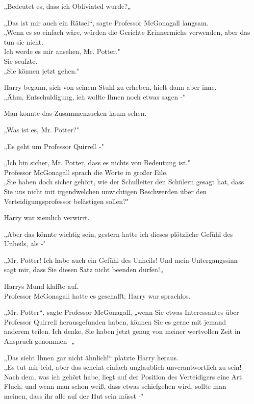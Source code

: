 {„Bedeutet es, dass ich Obliviated wurde?„

„Das ist mir auch ein Rätsel“, sagte Professor McGonagall langsam.\\ „Wenn es so einfach wäre, würden die Gerichte Erinnermichs verwenden, aber das tun sie nicht.\\ Ich werde es mir ansehen, Mr. Potter."\\ Sie seufzte.\\ „Sie können jetzt gehen."

Harry begann, sich von seinem Stuhl zu erheben, hielt dann aber inne.\\ „Ähm, Entschuldigung, ich wollte Ihnen noch etwas sagen -"

Man konnte das Zusammenzucken kaum sehen.

„Was ist es, Mr. Potter?"

„Es geht um Professor Quirrell -"

„Ich bin sicher, Mr. Potter, dass es nichts von Bedeutung ist."\\ Professor McGonagall sprach die Worte in großer Eile.\\ „Sie haben doch sicher gehört, wie der Schulleiter den Schülern gesagt hat, dass Sie uns nicht mit irgendwelchen unwichtigen Beschwerden über den Verteidigungsprofessor belästigen sollen?"

Harry war ziemlich verwirrt.

„Aber das könnte wichtig sein, gestern hatte ich dieses plötzliche Gefühl des Unheils, als -"

„Mr. Potter! Ich habe auch ein Gefühl des Unheils! Und mein Untergangssinn sagt mir, dass Sie diesen Satz nicht beenden dürfen!„

Harrys Mund klaffte auf.\\ Professor McGonagall hatte es geschafft; Harry war sprachlos.

„Mr. Potter“, sagte Professor McGonagall, „wenn Sie etwas Interessantes über Professor Quirrell herausgefunden haben, können Sie es gerne mit jemand anderem teilen. Ich denke, Sie haben jetzt genug von meiner wertvollen Zeit in Anspruch genommen -„

„Das sieht Ihnen gar nicht ähnlich!“ platzte Harry heraus.\\ „Es tut mir leid, aber das scheint einfach unglaublich unverantwortlich zu sein!\\ Nach dem, was ich gehört habe, liegt auf der Position des Verteidigers eine Art Fluch, und wenn man schon weiß, dass etwas schiefgehen wird, sollte man meinen, dass ihr alle auf der Hut sein müsst -"

}
